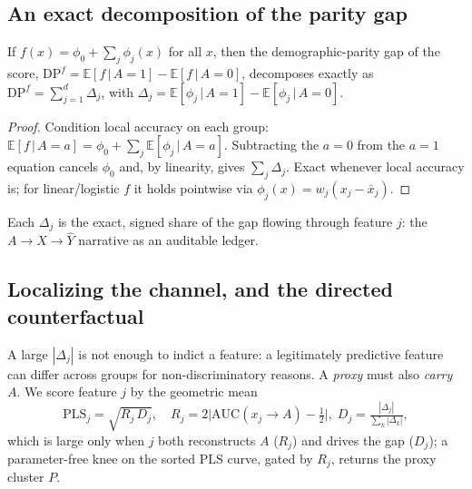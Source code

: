 \documentclass[sn-mathphys-num]{sn-jnl}
\newcommand{\PLS}{\mathrm{PLS}}
\newcommand{\Exp}{\mathbb{E}}
\newcommand{\given}{\,\vert\,}
\begin{document}
\subsection{An exact decomposition of the parity gap}
\label{sec:decomp}
\begin{proposition}
\label{prop:decomp}
If $f(x)=\phi_0+\sum_{j}\phi_j(x)$ for all $x$, then the demographic-parity gap of
the score, $\mathrm{DP}^f=\Exp[f\given A{=}1]-\Exp[f\given A{=}0]$, decomposes
exactly as $\mathrm{DP}^f=\sum_{j=1}^d\Delta_j$, with
$\Delta_j=\Exp[\phi_j\given A{=}1]-\Exp[\phi_j\given A{=}0]$.
\end{proposition}
\begin{proof}
Condition local accuracy on each group: $\Exp[f\given A{=}a]=\phi_0+\sum_j\Exp[\phi_j\given A{=}a]$.
Subtracting the $a{=}0$ from the $a{=}1$ equation cancels $\phi_0$ and, by
linearity, gives $\sum_j\Delta_j$. Exact whenever local accuracy is; for
linear/logistic $f$ it holds pointwise via $\phi_j(x)=w_j(x_j-\bar x_j)$.
\end{proof}
\noindent
Each $\Delta_j$ is the exact, signed share of the gap flowing through feature
$j$: the $A\!\to\!X\!\to\!\hat Y$ narrative as an auditable ledger.

\subsection{Localizing the channel, and the directed counterfactual}
\label{sec:operator}
A large $|\Delta_j|$ is not enough to indict a feature: a legitimately predictive
feature can differ across groups for non-discriminatory reasons. A \emph{proxy}
must also \emph{carry} $A$. We score feature $j$ by the geometric mean
\begin{equation}
  \PLS_j=\sqrt{R_j\,D_j},\quad
  R_j=2\bigl|\mathrm{AUC}(x_j\!\to\!A)-\tfrac12\bigr|,\;
  D_j=\tfrac{|\Delta_j|}{\sum_k|\Delta_k|},
  \label{eq:pls}
\end{equation}
which is large only when $j$ both reconstructs $A$ ($R_j$) and drives the gap
($D_j$); a parameter-free knee on the sorted $\PLS$ curve, gated by $R_j$, returns
the proxy cluster $P$.
\end{document}
